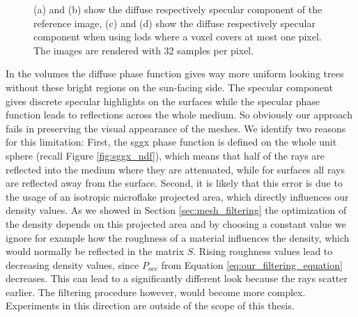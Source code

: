 \begin{figure}[ht]
\begin{subfigure}[b]{0.49\linewidth}
        \caption{}
    \end{subfigure}
    \caption[Diffuse and specular components rendered seperately]{(a) and (b) show the diffuse respectively specular component of the reference image, (c) and (d) show the diffuse respectively specular component when using \acsp{lod} where a voxel covers at most one pixel. The images are rendered with 32 samples per pixel.}
	\label{fig:diffuse_specular_breakdown}
\end{figure}
In the volumes the diffuse phase function gives way more uniform looking trees without these bright regions on the sun-facing side.
The specular component gives discrete specular highlights on the surfaces while the specular phase function leads to reflections across the whole medium.
So obviously our approach fails in preserving the visual appearance of the meshes.
We identify two reasons for this limitation: First, the \ac{sggx} phase function is defined on the whole unit sphere (recall Figure \ref{fig:sggx_ndf}), which means that half of the rays are reflected into the medium where they are attenuated, while for surfaces all rays are reflected away from the surface.
Second, it is likely that this error is due to the usage of an isotropic microflake projected area, which directly influences our density values.
As we showed in Section \ref{sec:mesh_filtering} the optimization of the density depends on this projected area and by choosing a constant value we ignore for example how the roughness of a material influences the density, which would normally be reflected in the matrix $S$.
Rising roughness values lead to decreasing density values, since $P_{occ}$ from Equation \ref{eq:our_filtering_equation} decreases.
This can lead to a significantly different look because the rays scatter earlier.
The filtering procedure however, would become more complex.
Experiments in this direction are outside of the scope of this thesis.


